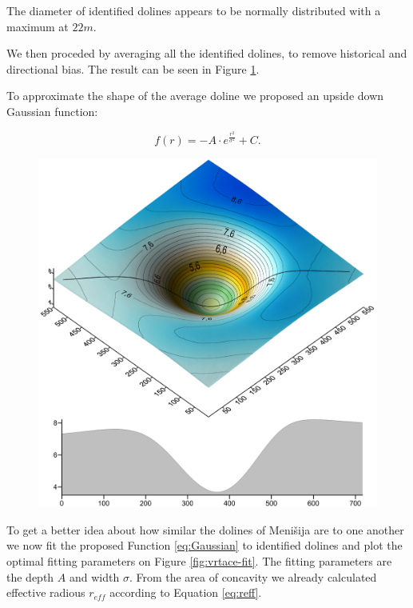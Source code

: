 \documentclass[a0,portrait]{a0poster}
\begin{document}
\begin{multicols}{2}
\vspace{5mm}
The diameter of identified dolines appears to be normally distributed with a maximum at $22m$.

We then proceded by averaging all the identified dolines, to remove historical and directional bias. The result can be seen in Figure \ref{fig:vrtaca}.

To approximate the shape of the average doline we proposed an upside down Gaussian function:

\begin{equation}
	f(r) = - A \cdot e^{\frac{r^2}{\sigma^2}} + C.
	\label{eq:Gaussian}
\end{equation}

\vfill
\columnbreak
\begin{figure}
  \includegraphics[width=\linewidth]{menisija-vrtaca.png}
  \label{fig:vrtaca}
\end{figure}

To get a better idea about how similar the dolines of Menišija are to one another we now fit the proposed Function \ref{eq:Gaussian} to identified dolines and plot the optimal fitting parameters on Figure \ref{fig:vrtace-fit}. The fitting parameters are the depth $A$ and width $\sigma$. From the area of concavity we already calculated effective radious $r_{eff}$ according to Equation \ref{eq:reff}.



\end{multicols}
\end{document}
